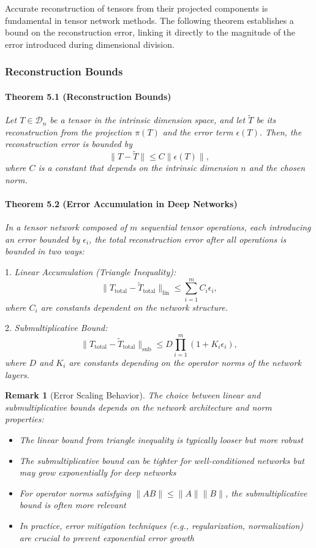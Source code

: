 \documentclass[sn-mathphys-num]{sn-jnl}
\theoremstyle{thmstyleone}
\theoremstyle{thmstyletwo}
\newtheorem{remark}{Remark}
\theoremstyle{thmstylethree}
\begin{document}
Accurate reconstruction of tensors from their projected components is fundamental in tensor network methods. The following theorem establishes a bound on the reconstruction error, linking it directly to the magnitude of the error introduced during dimensional division.

\subsubsection{Reconstruction Bounds}
\paragraph{Theorem 5.1 (Reconstruction Bounds)}
\emph{Let $T \in \mathcal{D}_n$ be a tensor in the intrinsic dimension space, and let $\tilde{T}$ be its reconstruction from the projection $\pi(T)$ and the error term $\epsilon(T)$. Then, the reconstruction error is bounded by}
\[
\|T - \tilde{T}\| \leq C \|\epsilon(T)\|,
\]
\emph{where $C$ is a constant that depends on the intrinsic dimension $n$ and the chosen norm.}

\paragraph{Theorem 5.2 (Error Accumulation in Deep Networks)}
\emph{In a tensor network composed of $m$ sequential tensor operations, each introducing an error bounded by $\epsilon_i$, the total reconstruction error after all operations is bounded in two ways:}

1. \emph{Linear Accumulation (Triangle Inequality):}
\[
\|T_{\text{total}} - \tilde{T}_{\text{total}}\|_{\text{lin}} \leq \sum_{i=1}^m C_i \epsilon_i,
\]
\emph{where $C_i$ are constants dependent on the network structure.}

2. \emph{Submultiplicative Bound:}
\[
\|T_{\text{total}} - \tilde{T}_{\text{total}}\|_{\text{sub}} \leq D \prod_{i=1}^m (1 + K_i\epsilon_i),
\]
\emph{where $D$ and $K_i$ are constants depending on the operator norms of the network layers.}

\begin{remark}[Error Scaling Behavior]
The choice between linear and submultiplicative bounds depends on the network architecture and norm properties:
\begin{itemize}
    \item The linear bound from triangle inequality is typically looser but more robust
    \item The submultiplicative bound can be tighter for well-conditioned networks but may grow exponentially for deep networks
    \item For operator norms satisfying $\|AB\| \leq \|A\|\|B\|$, the submultiplicative bound is often more relevant
    \item In practice, error mitigation techniques (e.g., regularization, normalization) are crucial to prevent exponential error growth
\end{itemize}
\end{remark}
\end{document}
